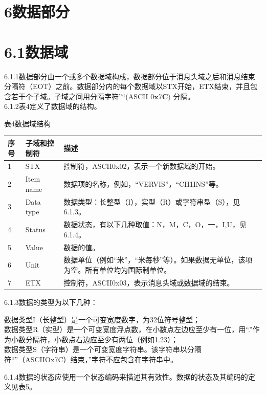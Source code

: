 \documentclass[
  10
]{article}
\begin{document}
\section{6数据部分}\label{ux6570ux636eux90e8ux5206}

\section{6.1数据域}\label{ux6570ux636eux57df}

6.1.1数据部分由一个或多个数据域构成，数据部分位于消息头域之后和消息结束分隔符（EOT）之前。数据部分内的每个数据域以STX开始，ETX结束，并且包含若干个子域。子域之间用分隔字符''\textbar``(ASCII
\(0 \mathbf { x } 7 \mathbf { C } )\) 分隔。\\
6.1.2表4定义了数据域的结构。

表4数据域结构

\begin{longtable}[]{@{}|l|l|l|@{}}
\toprule\noalign{}
\endhead
\bottomrule\noalign{}
\endlastfoot
\hline
序号 & 子域和控制符 & 描述 \\
\hline
1 & STX & 控制符，ASCII0x02，表示一个新数据域的开始。 \\
\hline
2 & Item name & 数据项的名称，例如，``VERVIS''，``CH1INS''等。 \\
\hline
3 & Data type &
数据类型：长整型（I），实型（R）或字符串型（S），见6.1.3。 \\
\hline
4 & Status & 数据状态，有以下几种取值：N，M，C，O，一，I,U，见6.1.4。 \\
\hline
5 & Value & 数据的值。 \\
\hline
6 & Unit &
数据单位（例如``米''，``米每秒''等）。如果数据无单位，该项为空。所有单位均为国际制单位。 \\
\hline
7 & ETX & 控制符，ASCII0x03，表示消息头域或数据域的结束。 \\
\hline
\end{longtable}

6.1.3数据的类型为以下几种：

数据类型I（长整型）是一个可变宽度数字，为32位符号整型；\\
数据类型R（实型）是一个可变宽度浮点数，在小数点左边应至少有一位，用``.''作为小数分隔符，小数点右边应至少有两位（例如1.23）；\\
数据类型S（字符串）是一个可变宽度字符串。该字符串以分隔符``\textbar''（ASCIIOx7C）结束，\textbar''字符不应包含在字符串中。

6.1.4数据的状态应使用一个状态编码来描述其有效性。数据的状态及其编码的定义见表5。
\end{document}
